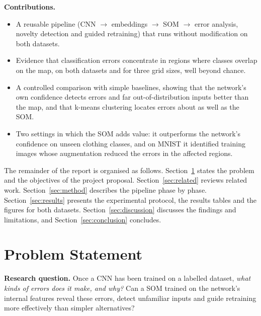 \documentclass{scrartcl}
\begin{document}
\textbf{Contributions.}
\begin{itemize}
  \item A reusable pipeline (CNN $\rightarrow$ embeddings $\rightarrow$ SOM $\rightarrow$ error analysis, novelty detection and guided retraining) that runs without modification on both datasets.
  \item Evidence that classification errors concentrate in regions where classes overlap on the map, on both datasets and for three grid sizes, well beyond chance.
  \item A controlled comparison with simple baselines, showing that the network's own confidence detects errors and far out-of-distribution inputs better than the map, and that k-means clustering locates errors about as well as the SOM.
  \item Two settings in which the SOM adds value: it outperforms the network's confidence on unseen clothing classes, and on MNIST it identified training images whose augmentation reduced the errors in the affected regions.
\end{itemize}

The remainder of the report is organised as follows. Section~\ref{sec:problem} states the problem and the objectives of the project proposal. Section~\ref{sec:related} reviews related work. Section~\ref{sec:method} describes the pipeline phase by phase. Section~\ref{sec:results} presents the experimental protocol, the results tables and the figures for both datasets. Section~\ref{sec:discussion} discusses the findings and limitations, and Section~\ref{sec:conclusion} concludes.

\section{Problem Statement}\label{sec:problem}

\textbf{Research question.} Once a CNN has been trained on a labelled dataset, \emph{what kinds of errors does it make, and why?} Can a SOM trained on the network's internal features reveal these errors, detect unfamiliar inputs and guide retraining more effectively than simpler alternatives?
\end{document}
